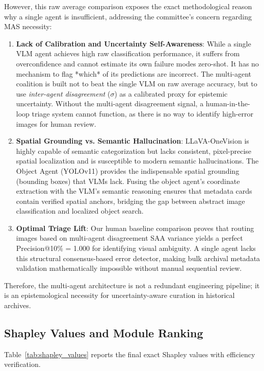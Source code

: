 \documentclass[12pt,onecolumn,a4paper]{IEEEtran}
\begin{document}
However, this raw average comparison exposes the exact methodological reason why a single agent is insufficient, addressing the committee's concern regarding MAS necessity:
\begin{enumerate}
    \item \textbf{Lack of Calibration and Uncertainty Self-Awareness}: While a single VLM agent achieves high raw classification performance, it suffers from overconfidence and cannot estimate its own failure modes zero-shot. It has no mechanism to flag *which* of its predictions are incorrect. The multi-agent coalition is built not to beat the single VLM on raw average accuracy, but to use \textit{inter-agent disagreement} ($\sigma$) as a calibrated proxy for epistemic uncertainty. Without the multi-agent disagreement signal, a human-in-the-loop triage system cannot function, as there is no way to identify high-error images for human review.
    \item \textbf{Spatial Grounding vs. Semantic Hallucination}: LLaVA-OneVision is highly capable of semantic categorization but lacks consistent, pixel-precise spatial localization and is susceptible to modern semantic hallucinations. The Object Agent (YOLOv11) provides the indispensable spatial grounding (bounding boxes) that VLMs lack. Fusing the object agent's coordinate extraction with the VLM's semantic reasoning ensures that metadata cards contain verified spatial anchors, bridging the gap between abstract image classification and localized object search.
    \item \textbf{Optimal Triage Lift}: Our human baseline comparison proves that routing images based on multi-agent disagreement SAA variance yields a perfect Precision@10\% = 1.000 for identifying visual ambiguity. A single agent lacks this structural consensus-based error detector, making bulk archival metadata validation mathematically impossible without manual sequential review.
\end{enumerate}
Therefore, the multi-agent architecture is not a redundant engineering pipeline; it is an epistemological necessity for uncertainty-aware curation in historical archives.

\subsection{Shapley Values and Module Ranking}

Table~\ref{tab:shapley_values} reports the final exact Shapley values with efficiency verification.
\end{document}
